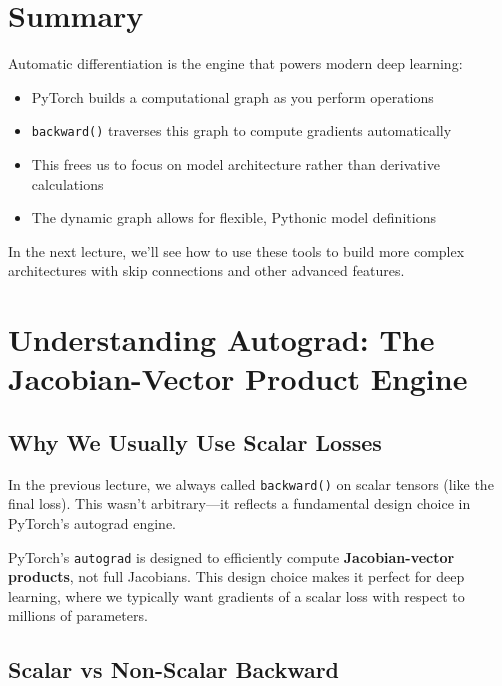\documentclass{article}
\begin{document}
\section{Summary}

Automatic differentiation is the engine that powers modern deep learning:
\begin{itemize}
    \item PyTorch builds a computational graph as you perform operations
    \item \texttt{backward()} traverses this graph to compute gradients automatically
    \item This frees us to focus on model architecture rather than derivative calculations
    \item The dynamic graph allows for flexible, Pythonic model definitions
\end{itemize}

In the next lecture, we'll see how to use these tools to build more complex architectures with skip connections and other advanced features.



\section{Understanding Autograd: The Jacobian-Vector Product Engine}

\subsection{Why We Usually Use Scalar Losses}

In the previous lecture, we always called \texttt{backward()} on scalar tensors (like the final loss). This wasn't arbitrary—it reflects a fundamental design choice in PyTorch's autograd engine.

\begin{tcolorbox}[colback=blue!5!white, colframe=blue!50!black, title=Key Insight: Autograd Computes Jacobian-Vector Products]
PyTorch's \texttt{autograd} is designed to efficiently compute \textbf{Jacobian-vector products}, not full Jacobians. This design choice makes it perfect for deep learning, where we typically want gradients of a scalar loss with respect to millions of parameters.
\end{tcolorbox}

\subsection{Scalar vs Non-Scalar Backward}
\end{document}
